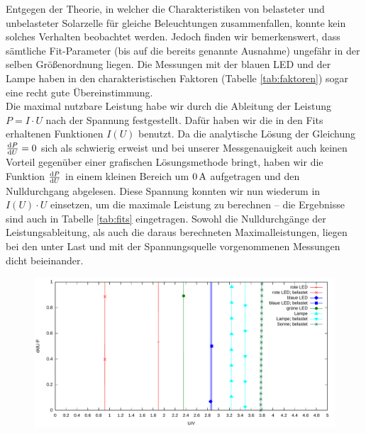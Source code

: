 \documentclass[numbers=noenddot,12pt,a4paper]{scrartcl}
\newcommand{\diff}{\textnormal{d}}
\begin{document}
Entgegen der Theorie, in welcher die Charakteristiken von belasteter und unbelasteter Solarzelle für gleiche Beleuchtungen zusammenfallen, konnte kein solches Verhalten beobachtet werden. Jedoch finden wir bemerkenswert, dass sämtliche Fit-Parameter (bis auf die bereits genannte Ausnahme) ungefähr in der selben Größenordnung liegen. Die Messungen mit der blauen LED und der Lampe haben in den charakteristischen Faktoren (Tabelle \ref{tab:faktoren}) sogar eine recht gute Übereinstimmung.\\
Die maximal nutzbare Leistung habe wir durch die Ableitung der Leistung $P=I\cdot U$ nach der Spannung festgestellt. Dafür haben wir die in den Fits erhaltenen Funktionen $I(U)$ benutzt. Da die analytische Lösung der Gleichung $\frac{\diff P}{\diff U}=0$ sich als schwierig erweist und bei unserer Messgenauigkeit auch keinen Vorteil gegenüber einer grafischen Lösungsmethode bringt, haben wir die Funktion $\frac{\diff P}{\diff U}$ in einem kleinen Bereich um $\unit[0]{A}$ aufgetragen und den Nulldurchgang abgelesen. Diese Spannung konnten wir nun wiederum in $I(U)\cdot U$ einsetzen, um die maximale Leistung zu berechnen -- die Ergebnisse sind auch in Tabelle \ref{tab:fits} eingetragen. Sowohl die Nulldurchgänge der Leistungsableitung, als auch die daraus berechneten Maximalleistungen, liegen bei den unter Last und mit der Spannungsquelle vorgenommenen Messungen dicht beieinander.
\begin{figure}[H]
	\includegraphics[width=\textwidth]{messwerte/leistungsmaxima.pdf}
\end{figure}
\end{document}
